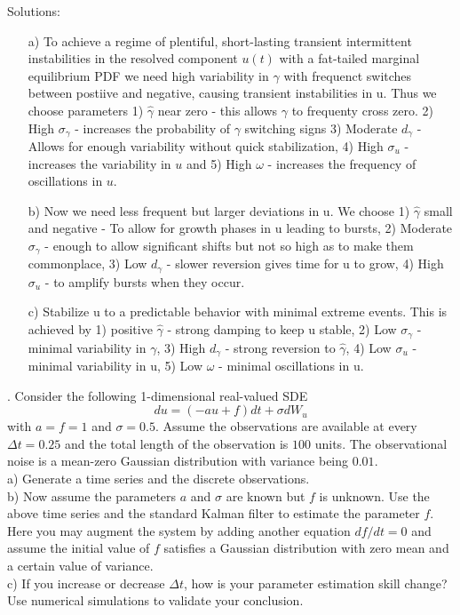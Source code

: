 \documentclass[a4paper,notitlepage,cs4size,cap,indent,oneside,12pt]{article}
\numberwithin{equation}{section}
\numberwithin{figure}{section}
\newcommand{\blue}{\color{blue}}
\begin{document}
{\blue
\noindent Solutions: \\
\begin{enumerate}
  \item [a)] To achieve a regime of plentiful, short-lasting transient intermittent instabilities in the resolved component $u(t)$ with a fat-tailed marginal equilibrium PDF we need high variability in $\gamma$ with frequenct switches between postiive and negative, causing transient instabilities in u. Thus we choose parameters 1) $\hat{\gamma}$ near zero - this allows $\gamma$ to frequenty cross zero. 2) High $\sigma_{\gamma}$ - increases the probability of $\gamma$ switching signs 3) Moderate $d_{\gamma}$ - Allows for enough variability without quick stabilization, 4) High $\sigma_u$ - increases the variability in $u$ and 5) High $\omega$ - increases the frequency of oscillations in $u$.
  \item [b)] Now we need less frequent but larger deviations in u. We choose 1) $\hat{\gamma}$ small and negative - To allow for growth phases in u leading to bursts, 2) Moderate $\sigma_{\gamma}$ - enough to allow significant shifts but not so high as to make them commonplace, 3) Low $d_{\gamma}$ - slower reversion gives time for u to grow, 4) High $\sigma_u$ - to amplify bursts when they occur.
  \item [c)] Stabilize u to a predictable behavior with minimal extreme events. This is achieved by 1) positive $\hat{\gamma}$ - strong damping to keep u stable, 2) Low $\sigma_{\gamma}$ - minimal variability in $\gamma$, 3) High $d_{\gamma}$ - strong reversion to $\hat{\gamma}$, 4) Low $\sigma_u$ - minimal variability in u, 5) Low $\omega$ - minimal oscillations in u.
\end{enumerate}

}
. Consider the following 1-dimensional real-valued SDE
\begin{equation*}
du = (-au + f)dt + \sigma dW_u
\end{equation*}
with $a=f=1$ and $\sigma=0.5$. Assume the observations are available at every $\Delta{t} = 0.25$ and the total length of the observation is $100$ units. The observational noise is a mean-zero Gaussian distribution with variance being $0.01$. \\
a) Generate a time series and the discrete observations.\\
b) Now assume the parameters $a$ and $\sigma$ are known but $f$ is unknown. Use the above time series and the standard Kalman filter to estimate the parameter $f$. Here you may augment the system by adding another equation $df/dt = 0$ and assume the initial value of $f$ satisfies a Gaussian distribution with zero mean and a certain value of variance.\\
c) If you increase or decrease $\Delta{t}$, how is your parameter estimation skill change? Use numerical simulations to validate your conclusion.
\end{document}
